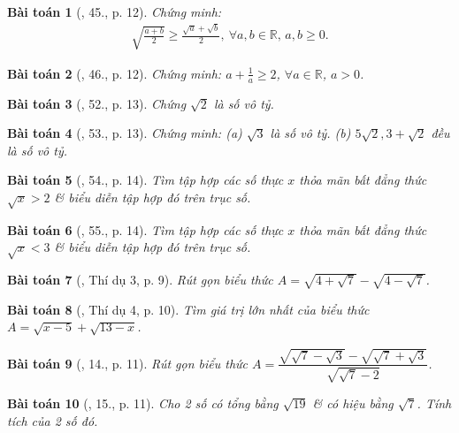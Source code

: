 \documentclass{article}
\newtheorem{baitoan}{Bài toán}
\begin{document}
\begin{baitoan}[\cite{SBT_Toan_9_tap_1}, 45., p. 12]
	Chứng minh:
	\begin{align*}
		\sqrt{\frac{a + b}{2}}\ge\frac{\sqrt{a} + \sqrt{b}}{2},\ \forall a,b\in\mathbb{R},\,a,b\ge0.
	\end{align*}
\end{baitoan}

\begin{baitoan}[\cite{SBT_Toan_9_tap_1}, 46., p. 12]
	Chứng minh: $a + \frac{1}{a}\ge2$, $\forall a\in\mathbb{R}$, $a > 0$.
\end{baitoan}

\begin{baitoan}[\cite{SBT_Toan_9_tap_1}, 52., p. 13]
	Chứng $\sqrt{2}$ là số vô tỷ.
\end{baitoan}

\begin{baitoan}[\cite{SBT_Toan_9_tap_1}, 53., p. 13]
	Chứng minh: (a) $\sqrt{3}$ là số vô tỷ. (b) $5\sqrt{2},3 + \sqrt{2}$ đều là số vô tỷ.
\end{baitoan}

\begin{baitoan}[\cite{SBT_Toan_9_tap_1}, 54., p. 14]
	Tìm tập hợp các số thực $x$ thỏa mãn bất đẳng thức $\sqrt{x} > 2$ \& biểu diễn tập hợp đó trên trục số.
\end{baitoan}

\begin{baitoan}[\cite{SBT_Toan_9_tap_1}, 55., p. 14]
	Tìm tập hợp các số thực $x$ thỏa mãn bất đẳng thức $\sqrt{x} < 3$ \& biểu diễn tập hợp đó trên trục số.
\end{baitoan}

\begin{baitoan}[\cite{Tuyen_Toan_9}, Thí dụ 3, p. 9]
	Rút gọn biểu thức $A = \sqrt{4 + \sqrt{7}} - \sqrt{4 - \sqrt{7}}$.
\end{baitoan}

\begin{baitoan}[\cite{Tuyen_Toan_9}, Thí dụ 4, p. 10]
	Tìm giá trị lớn nhất của biểu thức $A = \sqrt{x - 5} + \sqrt{13 - x}$.
\end{baitoan}

\begin{baitoan}[\cite{Tuyen_Toan_9}, 14., p. 11]
	Rút gọn biểu thức $A = \dfrac{\sqrt{\sqrt{7} - \sqrt{3}} - \sqrt{\sqrt{7} + \sqrt{3}}}{\sqrt{\sqrt{7} - 2}}$.
\end{baitoan}

\begin{baitoan}[\cite{Tuyen_Toan_9}, 15., p. 11]
	Cho 2 số có tổng bằng $\sqrt{19}$ \& có hiệu bằng $\sqrt{7}$. Tính tích của 2 số đó.
\end{baitoan}
\end{document}
